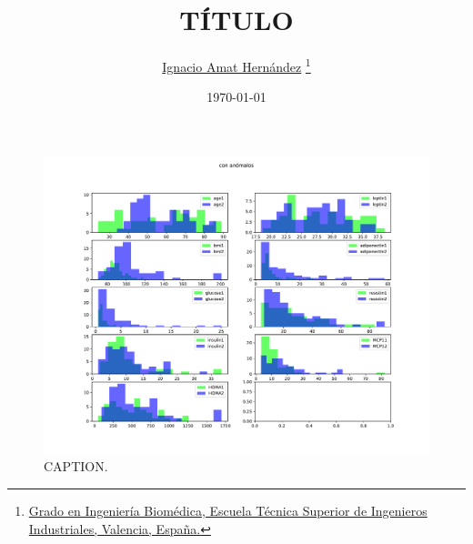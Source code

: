 \documentclass{article}
\title{\textbf{TÍTULO}}
\date{\today}
\author{
\href{mailto:igamher@etsid.upv.es}{Ignacio Amat Hernández}
\thanks{\href{https://www.upv.es/titulaciones/GIB/indexc.html}{Grado en Ingeniería Biomédica, Escuela Técnica Superior de Ingenieros Industriales, Valencia, España.}}
}
\begin{document}
\maketitle




\begin{figure}[h]
\centering
\includegraphics[width = 0.7\linewidth]{../python/images/hist.pdf}
\caption{CAPTION.}
\label{fig:LABEL_NAME}
\end{figure}
\end{document}

